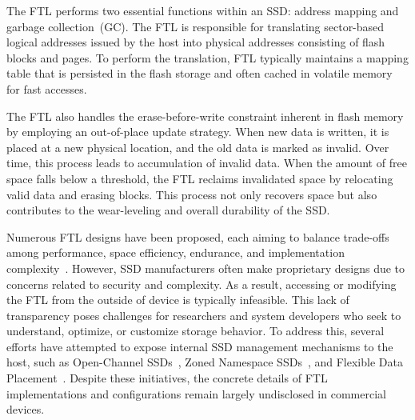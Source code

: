 The FTL performs two essential functions within an SSD: address mapping and garbage collection~(GC).
The FTL is responsible for translating sector-based logical addresses issued by the host into physical addresses consisting of flash blocks and pages.
To perform the translation, FTL typically maintains a mapping table that is persisted in the flash storage and often cached in volatile memory for fast accesses.

The FTL also handles the erase-before-write constraint inherent in flash memory by employing an out-of-place update strategy.
When new data is written, it is placed at a new physical location, and the old data is marked as invalid.
Over time, this process leads to accumulation of invalid data.
When the amount of free space falls below a threshold, the FTL reclaims invalidated space by relocating valid data and erasing blocks.
This process not only recovers space but also contributes to the wear-leveling and overall durability of the SSD.


Numerous FTL designs have been proposed, each aiming to balance trade-offs among performance, space efficiency, endurance, and implementation complexity~\cite{ftls,ftls,ftls}.
However, SSD manufacturers often make proprietary designs due to concerns related to security and complexity.
As a result, accessing or modifying the FTL from the outside of device is typically infeasible.
This lack of transparency poses challenges for researchers and system developers who seek to understand, optimize, or customize storage behavior.
To address this, several efforts have attempted to expose internal SSD management mechanisms to the host, such as Open-Channel SSDs~\cite{ocssd:fast17}, Zoned Namespace SSDs~\cite{zns:atc21}, and Flexible Data Placement~\cite{fdp}.
Despite these initiatives, the concrete details of FTL implementations and configurations remain largely undisclosed in commercial devices.
